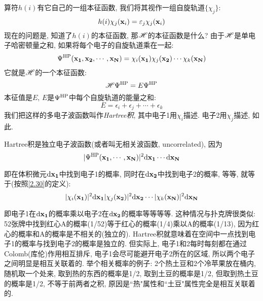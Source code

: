 算符$h(i)$有它自己的一组本征函数, 
我们将其视作一组自旋轨道$\{\chi_j\}$:
\begin{equation}
\label{2.29}
h(i)\chi_j(\mathbf{x}_i)=\varepsilon_j\chi_j(\mathbf{x}_i)
\end{equation}
现在的问题是, 
知道了$h(i)$的本征函数, 
那$\mathscr{H}$的本征函数是什么? 由于$\mathscr{H}$是单电子哈密顿量之和, 
如果将每个电子的自旋轨道乘在一起:
\begin{equation}
\label{2.30}
\Psi^{\rm HP}(\mathbf{x_1,x_2,\cdots,x_N})=\chi_i(\mathbf{x_1})\chi_j(\mathbf{x_2})\cdots\chi_k(\mathbf{x_N})
\end{equation}
它就是$\mathscr{H}$的一个本征函数:
\begin{equation}
\label{2.31}
\mathscr{H}\Psi^{\rm HP}=E\Psi^{\rm HP}
\end{equation}
本征值是$E$, 
$E$是$\Psi^{\rm HP}$中每个自旋轨道的能量之和:
\begin{equation}
\label{2.32}
E=\epsilon_i + \epsilon_j + \cdots + \epsilon_k
\end{equation} 
我们把这样的多电子波函数叫作\emph{Hartree积}, 
其中电子1用$\chi_i$描述. 
电子2用$\chi_j$描述, 
如此.



Hartree积是独立电子波函数(或者叫无相关波函数, uncorrelated), 因为
\begin{equation*}
|\Psi^{\rm HP}(\bo{x_1,\cdots,x_N})|^2\dd\bo{x_1}\cdots\dd\bo{x_N}
\end{equation*}

即在体积微元$\dd\bo{x_1}$中找到电子1的概率, 
同时在$\dd\bo{x_2}$中找到电子2的概率, 
等等, 
就等于(按照\autoref{2.30}的定义):
\begin{equation*}
|\chi_i(\bo{x_1})|^2\dd\bo{x_1}|\chi_j(\bo{x_2})|^2\dd\bo{x_2}\cdots|\chi_k(\bo{x_N})|^2\dd\bo{x_N}
\end{equation*}

即电子1在$\dd\bo{x_1}$的概率乘以电子2在$\dd\bo{x_2}$的概率等等等等. 
这种情况与扑克牌很类似: 52张牌中找到红心A的概率(1/52)等于红心的概率(1/4)乘以A的概率(1/13), 
因为红心的概率和A的概率是不相关的(独立的). 
Hartree积就意味着在空间中一点找到电子1的概率与找到电子2的概率是独立的. 
但实际上, 
电子1和2每时每刻都在通过Colomb(库伦)作用相互排斥, 
电子1会尽可能避开电子2所在的区域, 
所以两个电子之间明显是相互关联着的. 
举个相关概率的例子: 2个热土豆和2个冷苹果放在桶内, 
随机取一个处来, 
取到热的东西的概率是1/2, 
取到土豆的概率是1/2, 
但取到热土豆的概率是1/2, 
不等于前两者之积, 
原因是``热"属性和``土豆"属性完全是相互关联着的.


